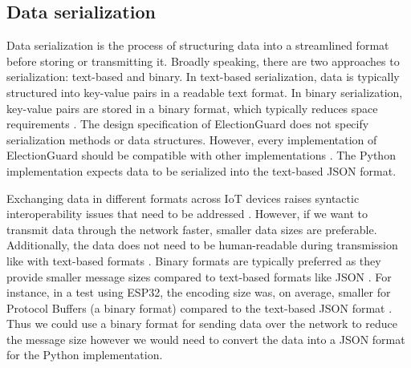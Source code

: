 \subsection{Data serialization}
Data serialization is the process of structuring data into a streamlined format before storing or transmitting it. Broadly speaking, there are two approaches to serialization: text-based and binary. In text-based serialization, data is typically structured into key-value pairs in a readable text format. In binary serialization, key-value pairs are stored in a binary format, which typically reduces space requirements \cite[11]{serialisation}. The design specification of ElectionGuard does not specify serialization methods or data structures. However, every implementation of ElectionGuard should be compatible with other implementations \cite[23]{eg-paper}. The Python implementation expects data to be serialized into the text-based JSON format.

Exchanging data in different formats across IoT devices raises syntactic interoperability issues that need to be addressed \cite[17]{protocols}. However, if we want to transmit data through the network faster, smaller data sizes are preferable. Additionally, the data does not need to be human-readable during transmission like with text-based formats \cite[225]{protobuffer}. Binary formats are typically preferred as they provide smaller message sizes compared to text-based formats like JSON \cite[11]{serialisation}. For instance, in a test using ESP32, the encoding size was, on average, smaller for Protocol Buffers (a binary format) compared to the text-based JSON format \cite[15]{serialisation-comparison}. Thus we could use a binary format for sending data over the network to reduce the message size however we would need to convert the data into a JSON format for the Python implementation. 

